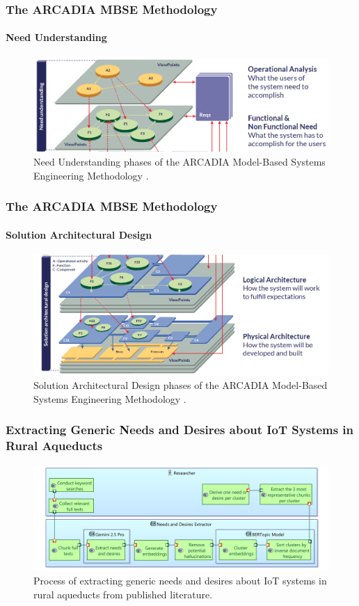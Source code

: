 \documentclass{beamer}
\begin{document}
\begin{frame}
    \frametitle{The ARCADIA MBSE Methodology}
    \framesubtitle{Need Understanding}

    \begin{figure}
        \centering
        \includegraphics[width=\textwidth]{images/phases_arcadia_1.png}
        \caption{Need Understanding phases of the ARCADIA Model-Based Systems Engineering Methodology \cite{Arcadia_phases}.}
    \end{figure}
\end{frame}

\begin{frame}
    \frametitle{The ARCADIA MBSE Methodology}
    \framesubtitle{Solution Architectural Design}

    \begin{figure}
        \centering
        \includegraphics[width=\textwidth]{images/phases_arcadia_2.png}
        \caption{Solution Architectural Design phases of the ARCADIA Model-Based Systems Engineering Methodology \cite{Arcadia_phases}.}
    \end{figure}
\end{frame}

\begin{frame}
    \frametitle{Extracting Generic Needs and Desires about IoT Systems in Rural Aqueducts}

    \begin{figure}
        \centering
        \includegraphics[width=\textwidth]{images/bertopic.png}
        \caption{Process of extracting generic needs and desires about IoT systems in rural aqueducts from published literature.}
    \end{figure}
\end{frame}
\end{document}
